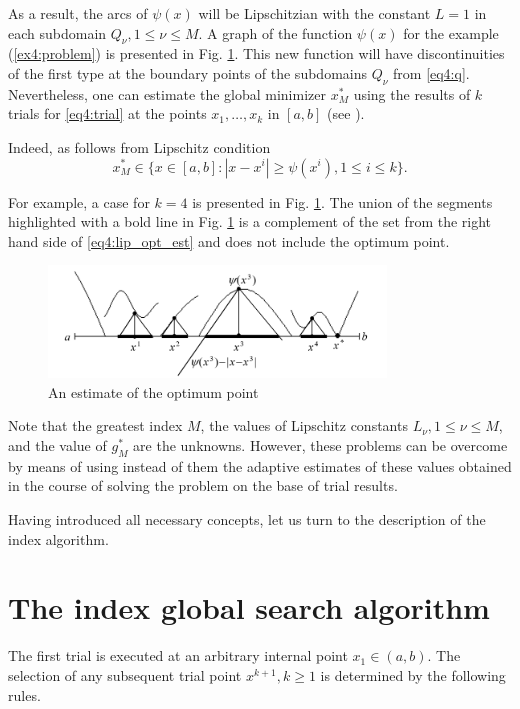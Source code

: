 As a result, the arcs of $\psi(x)$ will be Lipschitzian with the constant $L=1$ in each subdomain $Q_\nu,1\le\nu\le M$. A graph of the function $\psi(x)$ for the example (\ref{ex4:problem}) is presented in Fig. \ref{fig:4_4}. This new function will have discontinuities of the first type at the boundary points of the subdomains $Q_\nu$ from \eqref{eq4:q}. Nevertheless, one can estimate the global minimizer $x^*_M$ using the results of $k$ trials for \eqref{eq4:trial} at the points $x_1,\dots, x_k$ in $[a,b]$ (see \cite{strongin1992}).

Indeed, as follows from Lipschitz condition
\begin{equation}
  \label{eq4:lip_opt_est}
  x^*_M\in\{x\in[a,b]:|x-x^i|\ge\psi(x^i),1\le i\le k\}.
\end{equation}

For example, a case for $k=4$ is presented in Fig. \ref{fig:4_4}. The union of the segments highlighted with a bold line in Fig. \ref{fig:4_4} is a complement of the set from the right hand side of \eqref{eq4:lip_opt_est} and does not include the optimum point.
\begin{figure}[ht]
  \centering
  \includegraphics[width=0.8\textwidth]{figures/4_4.png}
  \caption{An estimate of the optimum point}
  \label{fig:4_4}
\end{figure}

Note that the greatest index $M$, the values of Lipschitz constants $L_\nu, 1\le \nu\le M$, and the value of $g_M^*$ are the unknowns. However, these problems can be overcome by means of using instead of them the adaptive estimates of these values obtained in the course of solving the problem on the base of trial results.

Having introduced all necessary concepts, let us turn to the description of the index algorithm.

\section{The index global search algorithm}
The first trial is executed at an arbitrary internal point $x_1\in(a,b)$. The selection of any subsequent trial point $x^{k+1},k\ge 1$ is determined by the following rules.

